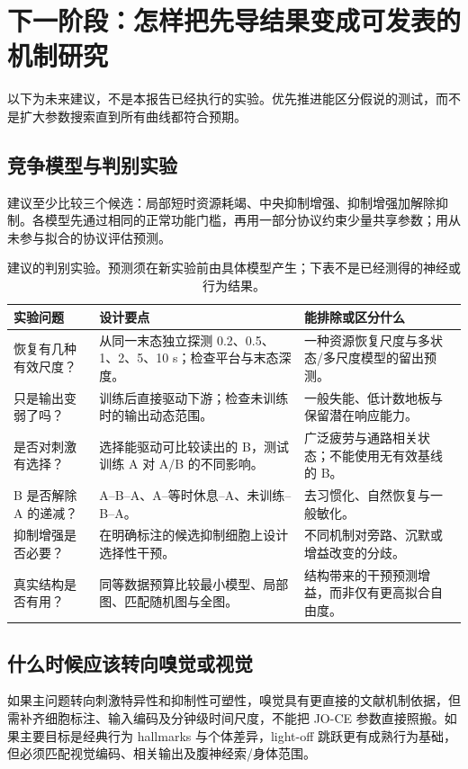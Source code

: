 \section{下一阶段：怎样把先导结果变成可发表的机制研究}
\label{sec:next}
以下为未来建议，不是本报告已经执行的实验。优先推进能区分假说的测试，而不是扩大参数搜索直到所有曲线都符合预期。

\subsection{竞争模型与判别实验}
建议至少比较三个候选：局部短时资源耗竭、中央抑制增强、抑制增强加解除抑制。各模型先通过相同的正常功能门槛，再用一部分协议约束少量共享参数；用从未参与拟合的协议评估预测。

\begin{table}[tbp]
\centering\small
\caption{建议的判别实验。预测须在新实验前由具体模型产生；下表不是已经测得的神经或行为结果。}
\label{tab:future}
\begin{tabularx}{\linewidth}{>{\raggedright\arraybackslash}p{3.2cm}YY}
\toprule
实验问题 & 设计要点 & 能排除或区分什么\\
\midrule
恢复有几种有效尺度？ & 从同一末态独立探测 0.2、0.5、1、2、5、10 s；检查平台与末态深度。 & 一种资源恢复尺度与多状态/多尺度模型的留出预测。\\
只是输出变弱了吗？ & 训练后直接驱动下游；检查未训练时的输出动态范围。 & 一般失能、低计数地板与保留潜在响应能力。\\
是否对刺激有选择？ & 选择能驱动可比较读出的 B，测试训练 A 对 A/B 的不同影响。 & 广泛疲劳与通路相关状态；不能使用无有效基线的 B。\\
B 是否解除 A 的递减？ & A--B--A、A--等时休息--A、未训练--B--A。 & 去习惯化、自然恢复与一般敏化。\\
抑制增强是否必要？ & 在明确标注的候选抑制细胞上设计选择性干预。 & 不同机制对旁路、沉默或增益改变的分歧。\\
真实结构是否有用？ & 同等数据预算比较最小模型、局部图、匹配随机图与全图。 & 结构带来的干预预测增益，而非仅有更高拟合自由度。\\
\bottomrule
\end{tabularx}
\end{table}

\subsection{什么时候应该转向嗅觉或视觉}
如果主问题转向刺激特异性和抑制性可塑性，嗅觉具有更直接的文献机制依据，但需补齐细胞标注、输入编码及分钟级时间尺度，不能把 JO-CE 参数直接照搬\citep{das2011}。如果主要目标是经典行为 hallmarks 与个体差异，light-off 跳跃更有成熟行为基础，但必须匹配视觉编码、相关输出及腹神经索/身体范围\citep{engel2009,boon2026}。


